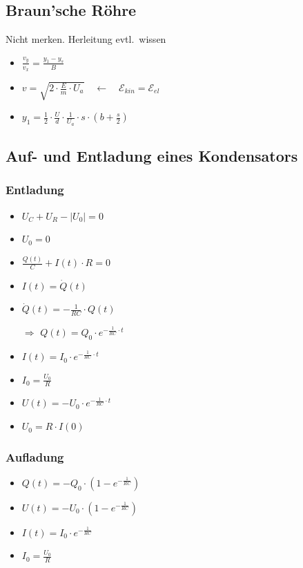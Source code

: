 \documentclass[paper = a4, twocolumn]{scrartcl}
\DeclareRobustCommand{\E}{\mathcal{E}}
\begin{document}
\subsection{Braun’sche Röhre}

Nicht merken. Herleitung evtl.\ wissen
\begin{itemize}
\item
	\( \frac{v_y}{v_x} = \frac{y_1 - y_s}{B} \)
\item
	\( v = \sqrt{2 \cdot \frac{E}{m} \cdot U_a} \quad \leftarrow \quad \E_{kin}
	= \E_{el} \)
\item
	\( y_1 = \frac{1}{2} \cdot \frac{U}{d} \cdot \frac{1}{U_a} \cdot s \cdot (b
	+ \frac{s}{2} ) \)
\end{itemize}

\subsection{Auf-  und Entladung eines Kondensators}
\subsubsection{Entladung}
\begin{itemize}
\item
	\( U_C + U_R - |U_0| = 0 \)
\item
	\( U_0 = 0 \)
\item
	\( \frac{Q(t)}{C} + I(t) \cdot R = 0 \)
\item
	\( I(t) = \dot{Q}(t) \)
\item
	\( \dot{Q}(t) = -\frac{1}{RC} \cdot Q(t) \)
\item[\(\Rightarrow\)]
	\( Q(t) = Q_0 \cdot e^{-\frac{1}{RC} \cdot t} \)
\item
	\( I(t) = I_0 \cdot e^{-\frac{1}{RC} \cdot t} \)
\item
	\( I_0 = \frac{U_0}{R} \)
\item
	\( U(t) = -U_0 \cdot e^{-\frac{1}{RC} \cdot t} \)
\item
	\( U_0 = R \cdot I(0) \)
\end{itemize}

\subsubsection{Aufladung}
\begin{itemize}
\item
	\( Q(t) = -Q_0 \cdot (1 - e^{-\frac{1}{RC}}) \)
\item
	\( U(t) = -U_0 \cdot (1 - e^{-\frac{1}{RC}}) \)
\item
	\( I(t) = I_0 \cdot  e^{-\frac{1}{RC}} \)
\item
	\( I_0 = \frac{U_0}{R} \)
\end{itemize}
\end{document}
